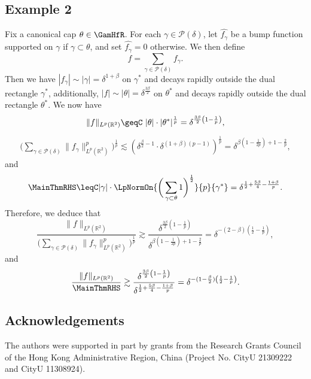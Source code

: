 \documentclass[reqno,centertags,11pt,a4paper]{amsart}
\begin{document}
\subsection*{Example 2} Fix a canonical cap \( \theta \in \GamHfR \). For each \( \gamma \in \mathcal{P}(\delta) \), let \( \widehat{f_\gamma} \) be a bump function supported on \( \gamma \) if \( \gamma \subset \theta \), and set \( \widehat{f_\gamma} = 0 \) otherwise. We then define
\[ f = \sum_{\gamma\in\mathcal{P}(\delta)}f_\gamma. \]
Then we have \(| f_\gamma| \sim |\gamma| = \delta^{1+\beta} \) on \( \gamma^* \) and decays rapidly outside the dual rectangle \( \gamma^* \), additionally, \( |f| \sim |\theta| = \delta^{\frac{3\beta}{2}} \) on \( \theta^* \) and decays rapidly outside the dual rectangle \( \theta^* \).
We now have
\begin{equation*}
    \|f\|_{L^p(\mathbb{R}^2)} \geqC \ |\theta| \cdot |\theta^*|^{\frac{1}{p}} = \delta^{\frac{3\beta}{2}\left(1-\frac{1}{p}\right)},
\end{equation*}
\begin{align*}
    \bigg(\sum_{\gamma \in \mathcal{P}(\delta)} \|f_\gamma\|_{L^p(\mathbb{R}^2)}^p\bigg)^{\frac{1}{p}} \lesssim \left(\delta^{\frac{\beta}{2}-1} \cdot \delta^{(1+\beta)(p-1)}\right)^{\frac{1}{p}} = \delta^{\beta\left(1-\frac{1}{2p}\right)+1-\frac{2}{p}},
\end{align*}
and
\[ \MainThmRHS \leqC |\gamma| \cdot \LpNormOn{\bigg(\sum_{ \gamma \subset \theta } 1\bigg)^{\frac{1}{2}}}{p}{ \gamma^* } = \delta^{\frac{1}{2}+\frac{5\beta}{4}-\frac{1+\beta}{p}}. \]
Therefore, we deduce that
\begin{equation*}
    \frac{\|f\|_{L^p(\mathbb{R}^2)}}{\bigg(\sum_{\gamma \in \mathcal{P}(\delta)} \|f_\gamma\|_{L^p(\mathbb{R}^2)}^p\bigg)^{\frac{1}{p}}} \gtrsim \frac{\delta^{\frac{3\beta}{2}\left(1-\frac{1}{p}\right)}}{\delta^{\beta\left(1-\frac{1}{2p}\right)+1-\frac{2}{p}}} = \delta^{-(2-\beta)\left(\frac{1}{2} - \frac{1}{p}\right)},
\end{equation*}
and
\[ \frac{\|f\|_{L^p(\mathbb{R}^2)}}{\MainThmRHS} \gtrsim \frac{\delta^{\frac{3\beta}{2}\left(1-\frac{1}{p}\right)}}{\delta^{\frac{1}{2}+\frac{5\beta}{4}-\frac{1+\beta}{p}}} = \delta^{-(1-\frac{\beta}{2})\left(\frac{1}{2} - \frac{1}{p}\right)}. \]


\subsection*{Acknowledgements}
The authors were supported in part by grants from the Research Grants Council of the Hong Kong Administrative Region, China (Project No. CityU 21309222 and CityU 11308924).

\end{document}
